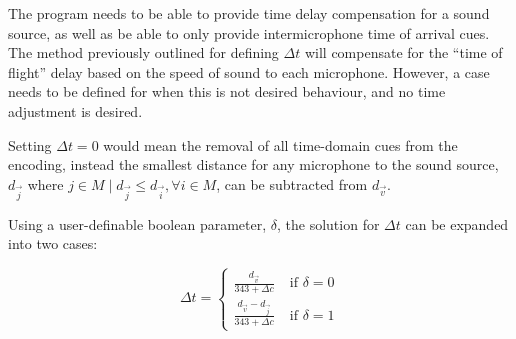 The program needs to be able to provide time delay compensation for a sound source, as well as be able to only provide intermicrophone time of arrival cues. The method previously outlined for defining $\Delta{}t$ will compensate for the ``time of flight'' delay based on the speed of sound to each microphone. However, a case needs to be defined for when this is not desired behaviour, and no time adjustment is desired.

Setting $\Delta{}t = 0$ would mean the removal of all time-domain cues from the encoding, instead the smallest distance for any microphone to the sound source, $d_{\vec{j}}$ where $j \in M \; | \; d_{\vec{j}} \leq d_{\vec{i}} , \forall{}i \in M$, can be subtracted from $d_{\vec{v}}$.

Using a user-definable boolean parameter, $\delta$, the solution for $\Delta{}t$ can be expanded into two cases:

\begin{equation}
\Delta{}t = \begin{cases}
\frac{d_{\vec{v}}}{343 + \Delta{}c} \; & \text{if } \delta = 0 
\\[12pt]
\frac{d_{\vec{v}} - d_{\vec{j}}}{343 + \Delta{}c} \; & \text{if } \delta = 1
\end{cases}
\end{equation}

